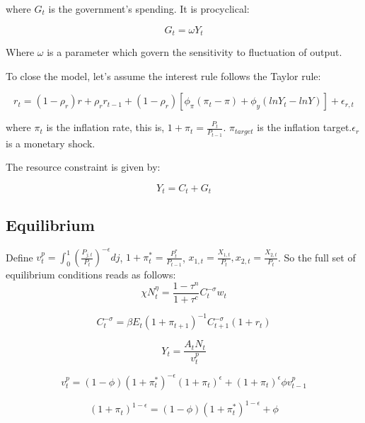 \documentclass[cn,10pt,math=newtx,citestyle=gb7714-2015,bibstyle=gb7714-2015]{elegantbook}
\begin{document}
	where $G_t$ is the government's spending. It is procyclical:
	
	\begin{equation}
		G_t=\omega Y_t
	\end{equation}
	
	Where $\omega$ is a parameter which govern the sensitivity to fluctuation of output.
	
	To close the model, let's assume the interest rule follows the Taylor rule:
	
	\begin{equation}
		r_t=(1-\rho_r)r+\rho_r r_{t-1}+(1-\rho_r)\left[\phi_{\pi}(\pi_t-\pi)+\phi_y\left(lnY_t-lnY\right)\right]+\epsilon_{r,t}
	\end{equation}
	
	where $\pi_t$ is the inflation rate, this is, $1+\pi_t=\frac{P_t}{P_{t-1}}$. $\pi_{target}$ is the inflation target.$\epsilon_r$ is a monetary shock.
	
	The resource constraint is given by:
	
	\begin{equation}
		Y_t=C_t+G_t
	\end{equation}
	
	\subsection{Equilibrium}
	
	Define $v_t^p=\int_0^1\left(\frac{P_{j,t}}{P_t}\right)^{-\epsilon}dj$, $1+\pi_t^{*}=\frac{P_t^{*}}{P_{t-1}}$, $x_{1,t}=\frac{X_{1,t}}{P_t}, x_{2,t}=\frac{X_{2,t}}{P_t}$. So the full set of equilibrium conditions reads as follows:
	\begin{equation}
		\chi N_t^{\eta}=\frac{1-\tau^n}{1+\tau^c}C_t^{-\sigma}w_t
	\end{equation}
	
	\begin{equation}
		C_t^{-\sigma}=\beta E_t(1+\pi_{t+1})^{-1}C_{t+1}^{-\sigma}(1+r_t)
	\end{equation}
	
	\begin{equation}
		Y_t=\frac{A_tN_t}{v_t^p}
	\end{equation}
	
	\begin{equation}
		v_t^p=(1-\phi)(1+\pi_t^{*})^{-\epsilon}(1+\pi_t)^{\epsilon}+(1+\pi_t)^{\epsilon}\phi v_{t-1}^p
	\end{equation}
	
	\begin{equation}
		(1+\pi_t)^{1-\epsilon}=(1-\phi)(1+\pi_t^{*})^{1-\epsilon}+\phi
	\end{equation}
	
\end{document}
